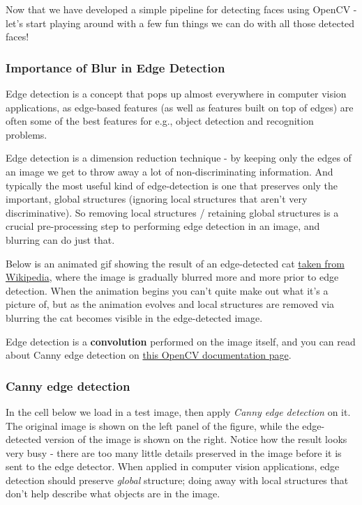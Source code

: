 \documentclass[11pt]{article}
\begin{document}
    Now that we have developed a simple pipeline for detecting faces using
OpenCV - let's start playing around with a few fun things we can do with
all those detected faces!

    \hypertarget{importance-of-blur-in-edge-detection}{%
\subsubsection{Importance of Blur in Edge
Detection}\label{importance-of-blur-in-edge-detection}}

Edge detection is a concept that pops up almost everywhere in computer
vision applications, as edge-based features (as well as features built
on top of edges) are often some of the best features for e.g., object
detection and recognition problems.

Edge detection is a dimension reduction technique - by keeping only the
edges of an image we get to throw away a lot of non-discriminating
information. And typically the most useful kind of edge-detection is one
that preserves only the important, global structures (ignoring local
structures that aren't very discriminative). So removing local
structures / retaining global structures is a crucial pre-processing
step to performing edge detection in an image, and blurring can do just
that.

Below is an animated gif showing the result of an edge-detected cat
\href{https://en.wikipedia.org/wiki/Gaussian_blur\#Common_uses}{taken
from Wikipedia}, where the image is gradually blurred more and more
prior to edge detection. When the animation begins you can't quite make
out what it's a picture of, but as the animation evolves and local
structures are removed via blurring the cat becomes visible in the
edge-detected image.

Edge detection is a \textbf{convolution} performed on the image itself,
and you can read about Canny edge detection on
\href{http://docs.opencv.org/2.4/doc/tutorials/imgproc/imgtrans/canny_detector/canny_detector.html}{this
OpenCV documentation page}.

    \hypertarget{canny-edge-detection}{%
\subsubsection{Canny edge detection}\label{canny-edge-detection}}

In the cell below we load in a test image, then apply \emph{Canny edge
detection} on it. The original image is shown on the left panel of the
figure, while the edge-detected version of the image is shown on the
right. Notice how the result looks very busy - there are too many little
details preserved in the image before it is sent to the edge detector.
When applied in computer vision applications, edge detection should
preserve \emph{global} structure; doing away with local structures that
don't help describe what objects are in the image.
\end{document}
